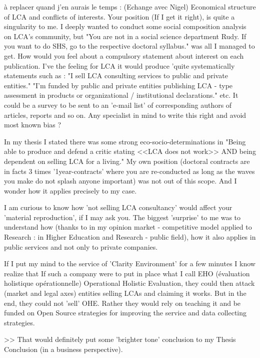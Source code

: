 %


à replacer quand j'en aurais le temps : (Echange avec Nigel)
Economical structure of LCA and conflicts of interests.
Your position (If I get it right), is quite a singularity to me. I deeply wanted to conduct some social composition analysis on LCA's community, but "You are not in a social science department Rudy. If you want to do SHS, go to the respective doctoral syllabus." was all I managed to get.
How would you feel about a compulsory statement about interest on each publication. I've the feeling for LCA it would produce 'quite systematically statements such as :
"I sell LCA consulting services to public and private entities."
"I'm funded by public and private entities publishing LCA - type assessment in products or organizational / institutional declarations."
etc.
It could be a survey to be sent to an 'e-mail list' of corresponding authors of articles, reports and so on. Any specialist in mind to write this right and avoid most known bias ?


In my thesis I stated there was some strong eco-socio-determinations in "Being able to produce and defend a critic stating <<LCA does not work>> AND being dependent on selling LCA for a living." My own position (doctoral contracts are in facts 3 times '1year-contracts' where you are re-conducted as long as the waves you make do not splash anyone important) was not out of this scope. And I wonder how it applies precisely to my case.

I am curious to know how 'not selling LCA consultancy' would affect your 'material reproduction', if I may ask you.
The biggest 'surprise' to me was to understand how (thanks to in my opinion market - competitive model applied to Research : in Higher Education and Research - public field), how it also applies in public services and not only to private companies.

If I put my mind to the service of 'Clarity Environment' for a few minutes I know realize that If such a company were to put in place what I call EHO (évaluation holistique opérationnelle) Operational Holistic Evaluation, they could then attack (market and legal axes) entities selling LCAs and claiming it works. But in the end, they could not 'sell' OHE. Rather they would rely on teaching it and be funded on Open Source strategies for improving the service and data collecting strategies.

>> That would definitely put some 'brighter tone' conclusion to my Thesis Conclusion (in a business perspective).
